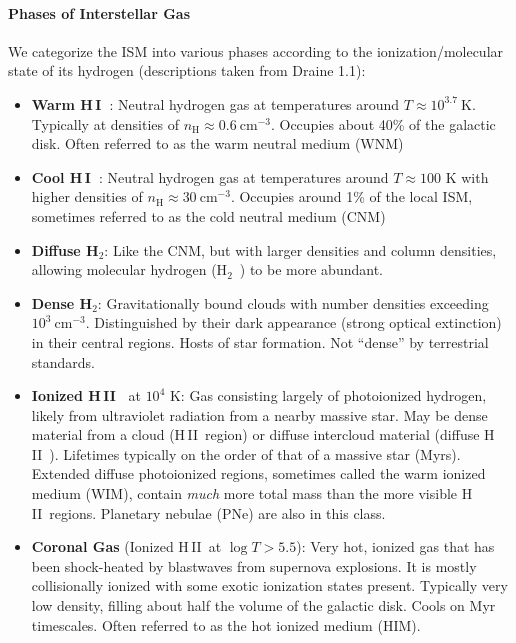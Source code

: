 \documentclass[10pt]{article}
\numberwithin{equation}{section}
\newcommand{\HI}{H\,I\ }
\newcommand{\HII}{H\,II\ }
\newcommand{\Htwo}{H$_2$\ }
\begin{document}
\paragraph{Phases of Interstellar Gas} %
\label{ssub:phases_of_interstellar_gas}
We categorize the ISM into various phases according to the ionization/molecular
state of its hydrogen (descriptions taken from Draine 1.1):
  \begin{itemize}
    \item \textbf{Warm \HI}: Neutral hydrogen gas at temperatures around $T
    \approx 10^{3.7}\ \mathrm{K}$. Typically at densities of
    $n_{\mathrm{H}}\approx 0.6\ \mathrm{cm^{-3}}$. Occupies about 40\% of the
    galactic disk. Often referred to as the warm neutral medium (WNM)
    \item \textbf{Cool \HI}: Neutral hydrogen gas at temperatures around $T
    \approx 100$ K with higher densities of $n_{\mathrm{H}}\approx 30\
    \mathrm{cm^{-3}}$. Occupies around 1\% of the local ISM, sometimes referred
    to as the cold neutral medium (CNM)
    \item \textbf{Diffuse H}$_{2}$: Like the CNM, but with larger densities and
    column densities, allowing molecular hydrogen (\Htwo) to be more abundant.
    \item \textbf{Dense H}$_{2}$: Gravitationally bound clouds with number
    densities exceeding $10^3\ \mathrm{cm^{-3}}$. Distinguished by their dark
    appearance (strong optical extinction) in their central regions. Hosts of
    star formation. Not ``dense'' by terrestrial standards.
    \item \textbf{Ionized \HII} at $10^4$ K: Gas consisting largely of
    photoionized hydrogen, likely from ultraviolet radiation from a nearby
    massive star. May be dense material from a cloud (\HII region) or diffuse
    intercloud material (diffuse \HII). Lifetimes typically on the order of
    that of a massive star (Myrs). Extended diffuse photoionized regions,
    sometimes called the warm ionized medium (WIM), contain \emph{much} more
    total mass than the more visible \HII regions. Planetary nebulae (PNe) are
    also in this class.
    \item \textbf{Coronal Gas} (Ionized \HII at $\log T > 5.5$): Very hot,
    ionized gas that has been shock-heated by blastwaves from supernova
    explosions. It is mostly collisionally ionized with some exotic ionization
    states present. Typically very low density, filling about half the volume
    of the galactic disk. Cools on Myr timescales. Often referred to as the hot
    ionized medium (HIM).
  \end{itemize}
\end{document}
